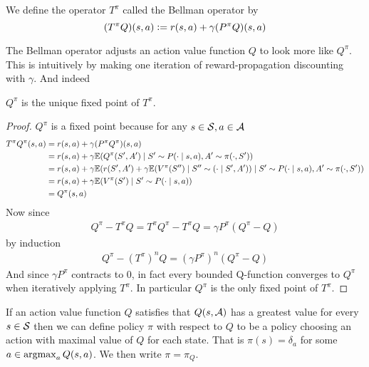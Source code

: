 \documentclass{article}
\begin{document}
We define the operator $T^\pi$ called the Bellman operator by
\[ (T^\pi Q)(s, a) \vcentcolon= r(s, a) + \gamma (P^\pi Q)(s, a) \]

The Bellman operator adjusts an action value function $Q$
to look more like $Q^\pi$. This is intuitively by making one
iteration of reward-propagation discounting with $\gamma$.
And indeed 
\begin{prop}
  $Q^\pi$ is the unique fixed point of $T^\pi$. 
  \label{prop:introQfixT}
\end{prop}
\begin{proof}
  $Q^\pi$ is a fixed point because for any $s \in \mathcal{S}, a \in \mathcal{A}$
  \begin{align*}
    T^\pi Q^\pi (s, a)
    = & \; r(s, a) + \gamma (P^\pi Q^\pi)(s, a)
    \\ = & \; r(s, a) + \gamma
    \mathbb{E}(Q^\pi(S',A') \mid S' \sim P(\cdot \mid s, a), A' \sim \pi(\cdot, S'))
    \\ = & \; r(s, a) + \gamma
    \mathbb{E}( r(S', A') + \gamma \mathbb{E}(V^\pi(S'') \mid S'' \sim (\cdot \mid S', A'))
    \mid S' \sim P(\cdot \mid s, a), A' \sim \pi(\cdot, S'))
    \\ = & \; r(s,a) + \gamma \mathbb{E}(V^\pi(S') \mid S' \sim P(\cdot \mid s, a))
    \\ = & \; Q^\pi(s, a)
  \end{align*}
  Now since
  \begin{align*}
    Q^\pi - T^\pi Q = T^\pi Q^\pi - T^\pi Q = \gamma P^\pi (Q^\pi - Q)
  \end{align*}
  by induction
  \begin{align*}
    Q^\pi - (T^\pi)^n Q = (\gamma P^\pi)^n (Q^\pi - Q)
  \end{align*}
  And since $\gamma P^\pi$ contracts to 0,
  in fact every bounded Q-function converges to $Q^\pi$ when iteratively applying
  $T^\pi$. In particular $Q^\pi$ is the only fixed point of $T^\pi$.
\end{proof}

If an action value function $Q$ satisfies that
$Q(s, \mathcal{A})$ has a greatest value for every $s \in \mathcal{S}$ then we can define
 policy $\pi$ with respect to $Q$
to be a policy choosing an action with maximal value of $Q$ for each state.
That is $\pi(s) = \delta_a$ for some $a \in \operatorname*{argmax}_a Q(s,a)$.
We then write $\pi = \pi_Q$.
\end{document}
